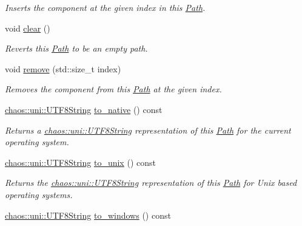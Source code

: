 \begin{DoxyCompactItemize}
\begin{DoxyCompactList}\small\item\em Inserts the component at the given index in this \hyperlink{classchaos_1_1io_1_1sys_1_1_path}{Path}. \end{DoxyCompactList}\item 
void \hyperlink{classchaos_1_1io_1_1sys_1_1_path_a7c4cd7e5d8e21a8c522f8a87f1e90f4c}{clear} ()
\begin{DoxyCompactList}\small\item\em Reverts this \hyperlink{classchaos_1_1io_1_1sys_1_1_path}{Path} to be an empty path. \end{DoxyCompactList}\item 
void \hyperlink{classchaos_1_1io_1_1sys_1_1_path_ae1f5ed612b5d85f99eb5dd436dd7b1ed}{remove} (std\+::size\+\_\+t index)
\begin{DoxyCompactList}\small\item\em Removes the component from this \hyperlink{classchaos_1_1io_1_1sys_1_1_path}{Path} at the given index. \end{DoxyCompactList}\item 
\hyperlink{classchaos_1_1uni_1_1_u_t_f8_string}{chaos\+::uni\+::\+U\+T\+F8\+String} \hyperlink{classchaos_1_1io_1_1sys_1_1_path_adb68b7589d18dc78f19d9dd6936d9833}{to\+\_\+native} () const 
\begin{DoxyCompactList}\small\item\em Returns a \hyperlink{classchaos_1_1uni_1_1_u_t_f8_string}{chaos\+::uni\+::\+U\+T\+F8\+String} representation of this \hyperlink{classchaos_1_1io_1_1sys_1_1_path}{Path} for the current operating system. \end{DoxyCompactList}\item 
\hyperlink{classchaos_1_1uni_1_1_u_t_f8_string}{chaos\+::uni\+::\+U\+T\+F8\+String} \hyperlink{classchaos_1_1io_1_1sys_1_1_path_a1cfe95a7a81ba7da856ae79917e6b1bf}{to\+\_\+unix} () const 
\begin{DoxyCompactList}\small\item\em Returns the \hyperlink{classchaos_1_1uni_1_1_u_t_f8_string}{chaos\+::uni\+::\+U\+T\+F8\+String} representation of this \hyperlink{classchaos_1_1io_1_1sys_1_1_path}{Path} for Unix based operating systems. \end{DoxyCompactList}\item 
\hyperlink{classchaos_1_1uni_1_1_u_t_f8_string}{chaos\+::uni\+::\+U\+T\+F8\+String} \hyperlink{classchaos_1_1io_1_1sys_1_1_path_ad7b185968a88741d52526a32738d0ab4}{to\+\_\+windows} () const 

\end{DoxyCompactItemize}
